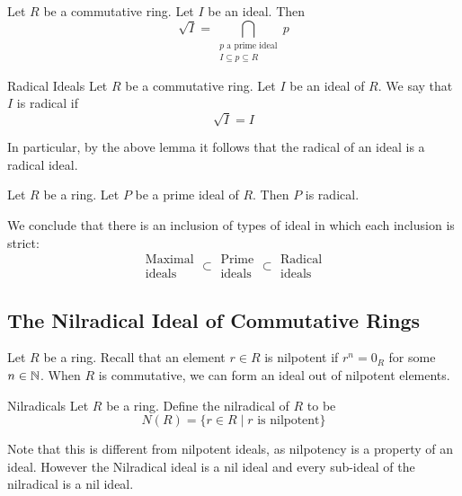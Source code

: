 \documentclass[a4paper]{article}
\begin{document}
\begin{prp}{}{} Let $R$ be a commutative ring. Let $I$ be an ideal. Then $$\sqrt{I}=\bigcap_{\substack{p\text{ a prime ideal}\\I\subseteq p\subseteq R}}p$$
\end{prp}

\begin{defn}{Radical Ideals}{} Let $R$ be a commutative ring. Let $I$ be an ideal of $R$. We say that $I$ is radical if $$\sqrt{I}=I$$
\end{defn}

In particular, by the above lemma it follows that the radical of an ideal is a radical ideal. 

\begin{lmm}{}{} Let $R$ be a ring. Let $P$ be a prime ideal of $R$. Then $P$ is radical. 
\end{lmm}

We conclude that there is an inclusion of types of ideal in which each inclusion is strict: $$\substack{\text{Maximal}\\\text{ideals}}\subset\substack{\text{Prime}\\\text{ideals}}\subset\substack{\text{Radical}\\\text{ideals}}$$

\subsection{The Nilradical Ideal of Commutative Rings}
Let $R$ be a ring. Recall that an element $r\in R$ is nilpotent if $r^n=0_R$ for some $n\in\mathbb{N}$. When $R$ is commutative, we can form an ideal out of nilpotent elements. 

\begin{defn}{Nilradicals}{} Let $R$ be a ring. Define the nilradical of $R$ to be $$N(R)=\{r\in R\;|\;r\text{ is nilpotent}\}$$
\end{defn}

Note that this is different from nilpotent ideals, as nilpotency is a property of an ideal. However the Nilradical ideal is a nil ideal and every sub-ideal of the nilradical is a nil ideal. 
\end{document}
